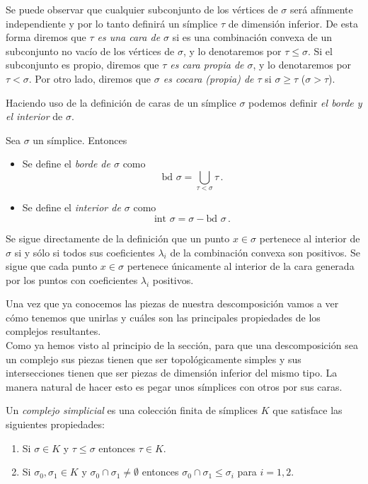Se puede observar que cualquier subconjunto de los vértices de $\sigma$ será afínmente independiente y por lo tanto definirá un símplice $\tau$ de dimensión inferior. De esta forma diremos que \emph{$\tau$ es una cara de $\sigma$} si es una combinación convexa de un subconjunto no vacío de los vértices de $\sigma$, y lo denotaremos por $\tau \leq \sigma$. Si el subconjunto es propio, diremos que \emph{$\tau$ es cara propia de $\sigma$}, y lo denotaremos por $\tau < \sigma$. Por otro lado, diremos que \emph{$\sigma$ es cocara (propia) de $\tau$}  si $\sigma \geq \tau$ ($\sigma > \tau$).

Haciendo uso de la definición de caras de un símplice $\sigma$ podemos definir \emph{el borde y el interior} de $\sigma$.

\begin{definition}
Sea $\sigma$ un símplice. Entonces
\begin{itemize}
	\item Se define el \emph{borde de $\sigma$} como \[\text{bd } \sigma = \bigcup_{\tau<\sigma}\tau\,.\]
	\item Se define el \emph{interior de $\sigma$} como \[\text{int }\sigma= \sigma - \text{bd }\sigma\,.\]
\end{itemize}
\end{definition}

\begin{remark}
Se sigue directamente de la definición que un punto $x \in \sigma$ pertenece al interior de $\sigma$ si y sólo si todos sus coeficientes $\lambda_i$ de la combinación convexa son positivos. Se sigue que cada punto $x \in \sigma$ pertenece únicamente al interior de la cara generada por los puntos con coeficientes $\lambda_i$ positivos.
\end{remark}

Una vez que ya conocemos las piezas de nuestra descomposición vamos a ver cómo tenemos que unirlas y cuáles son las principales propiedades de los complejos resultantes.\\
Como ya hemos visto al principio de la sección, para que una descomposición sea un complejo sus piezas tienen que ser topológicamente simples y sus intersecciones tienen que ser piezas de dimensión inferior del mismo tipo. La manera natural de hacer esto es pegar unos símplices con otros por sus caras.

\begin{definition}
Un \emph{complejo simplicial} es una colección finita de símplices $K$ que satisface las siguientes propiedades:
\begin{enumerate}
	\item Si $\sigma \in K$ y $\tau \leq \sigma$ entonces $\tau \in K$.
	\item Si $\sigma_0,\sigma_1 \in K$ y $\sigma_0 \cap \sigma_1 \neq \emptyset$ entonces $\sigma_0 \cap \sigma_1 \leq \sigma_i$ para $i = 1,2$.
\end{enumerate}
\end{definition}

